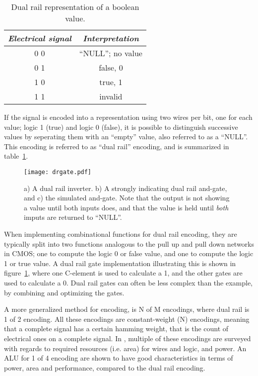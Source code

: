 \begin{table}
  \centering
  \begin{tabular}{|c|c|}
    \hline
    \emph{Electrical signal} & \emph{Interpretation} \\
    \hline
    0 0 & ``NULL''; no value \\
    0 1 & false, 0 \\
    1 0 & true, 1 \\
    1 1 & invalid \\
    \hline
  \end{tabular}
  \label{tab:dr}
  \caption{Dual rail representation of a boolean value.}
\end{table}

If the signal is encoded into a representation using two wires per
bit, one for each value; logic 1 (true) and logic 0 (false), it is
possible to distinguish successive values by seperating them with an
``empty'' value, also referred to as a ``NULL''. This encoding is
referred to as ``dual rail'' encoding, and is summarized in
table~\ref{tab:dr}.

\begin{figure}[htbp]
  \centering
  \texttt{[image: drgate.pdf]}
  \caption{a) A dual rail inverter. b) A strongly indicating dual rail
    and-gate, and c) the simulated and-gate. Note that the output is
    not showing a value until both inputs does, and that the value is
    held until \emph{both} imputs are returned to ``NULL''.}
  \label{fig:drgate}
\end{figure}

When implementing combinational functions for dual rail encoding, they
are typically split into two functions analogous to the pull up and
pull down networks in CMOS; one to compute the logic 0 or false value,
and one to compute the logic 1 or true value. A dual rail gate
implementation illustrating this is shown in figure~\ref{fig:drgate},
where one C-element is used to calculate a 1, and the other gates are
used to calculate a 0. Dual rail gates can often be less complex than
the example, by combining and optimizing the gates.

A more generalized method for encoding, is N of M encodings, where
dual rail is 1 of 2 encoding. All these encodings are constant-weight
(N) encodings, meaning that a complete signal has a certain hamming
weight, that is the count of electrical ones on a complete signal. In
\cite[chapter 9]{nullconv}, multiple of these encodings are surveyed
with regards to required resources (i.e. area) for wires and logic,
and power. An ALU for 1 of 4 encoding are shown to have good
characteristics in terms of power, area and performance, compared to
the dual rail encoding.

